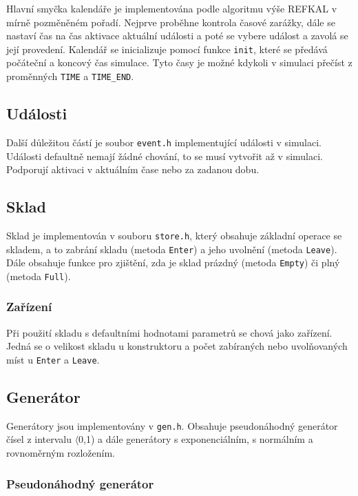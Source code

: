 \documentclass[12pt,a4paper,titlepage,final]{article}
\begin{document}
Hlavní smyčka kalendáře je implementována podle algoritmu výše REFKAL v mírně pozměněném pořadí. Nejprve proběhne kontrola časové zarážky, dále se nastaví čas na čas aktivace aktuální události a poté se vybere událost a zavolá se její provedení. Kalendář se inicializuje pomocí funkce \texttt{init}, které se předává počáteční a koncový čas simulace. Tyto časy je možné kdykoli v simulaci přečíst z proměnných \texttt{TIME} a \texttt{TIME\_END}.

\subsection{Události}

Další důležitou částí je soubor \texttt{event.h} implementující události v simulaci. Události defaultně nemají žádné chování, to se musí vytvořit až v simulaci. Podporují aktivaci v aktuálním čase nebo za zadanou dobu.

\subsection{Sklad}

Sklad je implementován v souboru \texttt{store.h}, který obsahuje základní operace se skladem, a to zabrání skladu (metoda \texttt{Enter}) a jeho uvolnění (metoda \texttt{Leave}). Dále obsahuje funkce pro zjištění, zda je sklad prázdný (metoda \texttt{Empty}) či plný (metoda \texttt{Full}). 

\subsubsection{Zařízení}
Při použití skladu s defaultními hodnotami parametrů se chová jako zařízení. Jedná se o velikost skladu u konstruktoru a počet zabíraných nebo uvolňovaných míst u \texttt{Enter} a \texttt{Leave}.

\subsection{Generátor}

Generátory jsou implementovány v \texttt{gen.h}. Obsahuje pseudonáhodný generátor čísel z intervalu $\langle$0,1) a dále generátory s exponenciálním, s normálním a rovnoměrným rozložením.

\subsubsection{Pseudonáhodný generátor}
\end{document}
